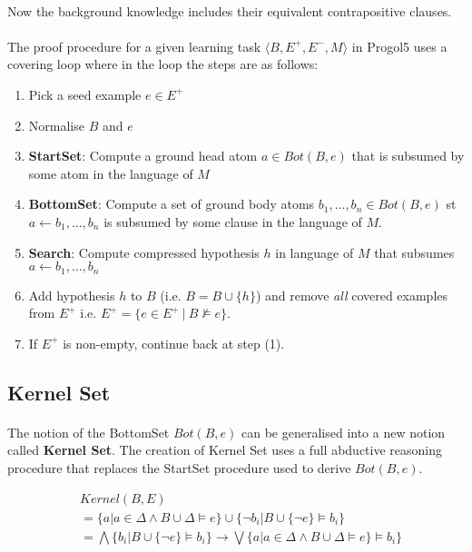 \documentclass{article}
\theoremstyle{plain}
\theoremstyle{definition}
\begin{document}
\begin{multicols}{2}
\paragraph{} Now the background knowledge includes their equivalent contrapositive clauses.

\paragraph{} The proof procedure for a given learning task $\langle B, E^+, E^-, M\rangle$ in Progol5 uses a covering loop where in the loop the steps are as follows:

\begin{enumerate}
\item Pick a seed example $e \in E^+$
\item Normalise $B$ and $e$
\item \textbf{StartSet}: Compute a ground head atom $a \in Bot(B, e)$ that is subsumed by some atom in the language of $M$
\item \textbf{BottomSet}: Compute a set of ground body atoms $b_1, \dots, b_n \in Bot(B, e)$ st $a \leftarrow b_1,\dots,b_n$ is subsumed by some clause in the language of $M$.
\item \textbf{Search}: Compute compressed hypothesis $h$ in language of $M$ that subsumes $a \leftarrow b_1, \dots, b_n$
\item Add hypothesis $h$ to $B$ (i.e. $B = B \cup \{h\}$) and remove \textit{all} covered examples from $E^+$ i.e. $E^+ = \{e \in E^+\ |\ B \not\models e\}$.
\item If $E^+$ is non-empty, continue back at step (1).
\end{enumerate}

\subsection{Kernel Set}

\paragraph{} The notion of the BottomSet $Bot(B, e)$ can be generalised into a new notion called \textbf{Kernel Set}. The creation of Kernel Set uses a full abductive reasoning procedure that replaces the StartSet procedure used to derive $Bot(B, e)$. 

{\footnotesize
\begin{align*}
& Kernel(B, E) \\
&= \{a | a \in \Delta \land B \cup \Delta \models e\} \cup \{\lnot b_i | B \cup \{\lnot e\} \models b_i\} \\
&= \bigwedge \{b_i | B \cup \{\lnot e\} \models b_i\} \rightarrow \bigvee \{a | a \in \Delta \land B \cup \Delta \models e\} \models b_i\}
\end{align*}}


\end{multicols}
\end{document}
